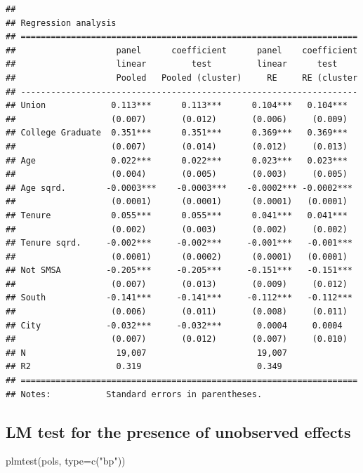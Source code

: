 \documentclass[
]{article}
\newenvironment{Shaded}{\begin{snugshade}}{\end{snugshade}}
\newcommand{\AttributeTok}[1]{\textcolor[rgb]{0.77,0.63,0.00}{#1}}
\newcommand{\FunctionTok}[1]{\textcolor[rgb]{0.00,0.00,0.00}{#1}}
\newcommand{\NormalTok}[1]{#1}
\newcommand{\StringTok}[1]{\textcolor[rgb]{0.31,0.60,0.02}{#1}}
\begin{document}
\begin{verbatim}
## 
## Regression analysis
## ===================================================================
##                    panel      coefficient      panel    coefficient
##                    linear         test         linear      test    
##                    Pooled   Pooled (cluster)     RE     RE (cluster
## -------------------------------------------------------------------
## Union             0.113***      0.113***      0.104***   0.104***  
##                   (0.007)       (0.012)       (0.006)     (0.009)  
## College Graduate  0.351***      0.351***      0.369***   0.369***  
##                   (0.007)       (0.014)       (0.012)     (0.013)  
## Age               0.022***      0.022***      0.023***   0.023***  
##                   (0.004)       (0.005)       (0.003)     (0.005)  
## Age sqrd.        -0.0003***    -0.0003***    -0.0002*** -0.0002*** 
##                   (0.0001)      (0.0001)      (0.0001)   (0.0001)  
## Tenure            0.055***      0.055***      0.041***   0.041***  
##                   (0.002)       (0.003)       (0.002)     (0.002)  
## Tenure sqrd.     -0.002***     -0.002***     -0.001***   -0.001*** 
##                   (0.0001)      (0.0002)      (0.0001)   (0.0001)  
## Not SMSA         -0.205***     -0.205***     -0.151***   -0.151*** 
##                   (0.007)       (0.013)       (0.009)     (0.012)  
## South            -0.141***     -0.141***     -0.112***   -0.112*** 
##                   (0.006)       (0.011)       (0.008)     (0.011)  
## City             -0.032***     -0.032***       0.0004     0.0004   
##                   (0.007)       (0.012)       (0.007)     (0.010)  
## N                  19,007                      19,007              
## R2                 0.319                       0.349               
## ===================================================================
## Notes:           Standard errors in parentheses.
\end{verbatim}

\hypertarget{lm-test-for-the-presence-of-unobserved-effects}{%
\subsection{LM test for the presence of unobserved
effects}\label{lm-test-for-the-presence-of-unobserved-effects}}

\begin{Shaded}
\begin{Highlighting}[]
  \FunctionTok{plmtest}\NormalTok{(pols, }\AttributeTok{type=}\FunctionTok{c}\NormalTok{(}\StringTok{"bp"}\NormalTok{))}
\end{Highlighting}
\end{Shaded}
\end{document}
